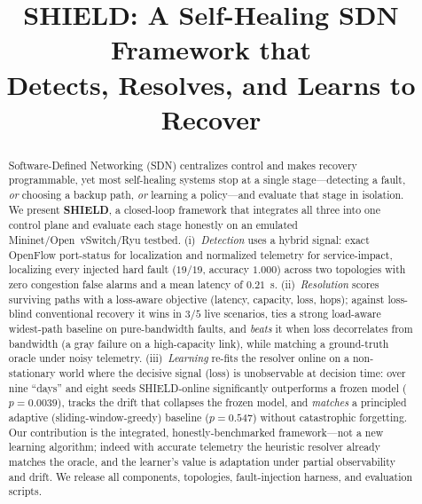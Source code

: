 \documentclass[conference]{IEEEtran}
\begin{document}
\title{SHIELD: A Self-Healing SDN Framework that\\
Detects, Resolves, and Learns to Recover}

\author{
}

\maketitle

\begin{abstract}
Software-Defined Networking (SDN) centralizes control and makes recovery
programmable, yet most self-healing systems stop at a single stage---detecting a
fault, \emph{or} choosing a backup path, \emph{or} learning a policy---and evaluate
that stage in isolation. We present \textbf{SHIELD}, a closed-loop framework that
integrates all three into one control plane and evaluate each stage honestly on an
emulated Mininet/Open~vSwitch/Ryu testbed. (i)~\emph{Detection} uses a hybrid signal:
exact OpenFlow port-status for localization and normalized telemetry for
service-impact, localizing every injected hard fault ($19/19$, accuracy $1.000$)
across two topologies with zero congestion false alarms and a mean latency of
$0.21$~s. %
(ii)~\emph{Resolution} scores surviving paths with a loss-aware objective
(latency, capacity, loss, hops); against loss-blind conventional recovery it wins in
$3/5$ live scenarios, ties a strong load-aware widest-path baseline on pure-bandwidth
faults, and \emph{beats} it when loss decorrelates from bandwidth (a gray failure on
a high-capacity link), while matching a ground-truth oracle under noisy telemetry.
(iii)~\emph{Learning} re-fits the resolver online on a non-stationary world where the
decisive signal (loss) is unobservable at decision time: over nine ``days'' and eight
seeds SHIELD-online significantly outperforms a frozen model ($p=0.0039$), tracks the
drift that collapses the frozen model, and \emph{matches} a principled adaptive
(sliding-window-greedy) baseline ($p=0.547$) without catastrophic forgetting.
Our contribution is the integrated, honestly-benchmarked framework---not a new
learning algorithm; indeed with accurate telemetry the heuristic resolver already
matches the oracle, and the learner's value is adaptation under partial observability
and drift. We release all components, topologies, fault-injection harness, and
evaluation scripts.
\end{abstract}
\end{document}
